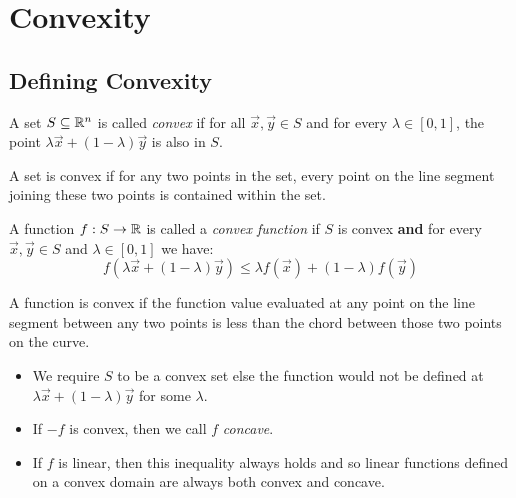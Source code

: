 \documentclass[../main.tex]{subfiles}
\begin{document}
\section{Convexity}
\subsection{Defining Convexity}
\begin{definition}
  A set $S \subseteq \mathbb{R}^{n}$ is called \textit{convex} if for all $\vec{x}, \vec{y} \in S$ and for every $\lambda \in [0, 1]$, the point $\lambda \vec{x} + (1 - \lambda)\vec{y}$ is also in $S$.
\end{definition}
\begin{remark}[Intuition]
  A set is convex if for any two points in the set, every point on the line segment joining these two points is contained within the set.
\end{remark}
\begin{definition}
  A function $f: S \to \mathbb{R}$  is called a \textit{convex function} if $S$ is convex \textbf{and} for every $\vec{x}, \vec{y} \in S$ and $\lambda \in [0, 1]$ we have:
  \[
    f(\lambda \vec{x} + (1 - \lambda)\vec{y}) \leq \lambda f(\vec{x}) + (1 - \lambda) f(\vec{y})
  \]
\end{definition}
\begin{remark}[Intuition]
  A function is convex if the function value evaluated at any point on the line segment between any two points is less than the chord between those two points on the curve.
\end{remark}
\begin{remark}[Remarks]
  \begin{itemize}
    \item We require $S$ to be a convex set else the function would not be defined at $\lambda \vec{x} + (1 - \lambda)\vec{y}$ for some $\lambda$.
    \item If $-f$ is convex, then we call $f$ \textit{concave}.
    \item If $f$ is linear, then this inequality always holds and so linear functions defined on a convex domain are always both convex and concave.
  \end{itemize}
\end{remark}
\end{document}
